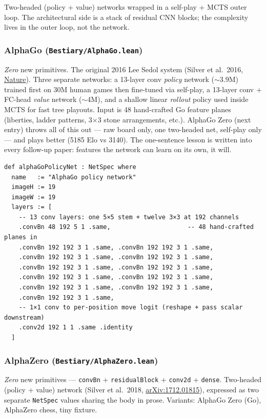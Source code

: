 Two-headed (policy + value) networks wrapped in a self-play + MCTS
outer loop. The architectural side is a stack of residual CNN blocks;
the complexity lives in the outer loop, not the network.

\subsubsection*{AlphaGo (\texttt{Bestiary/AlphaGo.lean})}
\emph{Zero} new primitives. The original 2016 Lee Sedol system
(Silver et al.\ 2016,
\href{https://www.nature.com/articles/nature16961}{Nature}).
Three separate networks: a 13-layer conv \emph{policy} network
($\sim$3.9M) trained first on 30M human games then fine-tuned via
self-play, a 13-layer conv + FC-head \emph{value} network
($\sim$4M), and a shallow linear \emph{rollout} policy used inside
MCTS for fast tree playouts. Input is 48 hand-crafted Go feature
planes (liberties, ladder patterns, 3$\times$3 stone arrangements,
etc.). AlphaGo Zero (next entry) throws all of this out --- raw
board only, one two-headed net, self-play only --- and plays better
(5185 Elo vs 3140). The one-sentence lesson is written into every
follow-up paper: features the network can learn on its own, it will.

\begin{verbatim}
def alphaGoPolicyNet : NetSpec where
  name   := "AlphaGo policy network"
  imageH := 19
  imageW := 19
  layers := [
    -- 13 conv layers: one 5×5 stem + twelve 3×3 at 192 channels
    .convBn 48 192 5 1 .same,                     -- 48 hand-crafted planes in
    .convBn 192 192 3 1 .same, .convBn 192 192 3 1 .same,
    .convBn 192 192 3 1 .same, .convBn 192 192 3 1 .same,
    .convBn 192 192 3 1 .same, .convBn 192 192 3 1 .same,
    .convBn 192 192 3 1 .same, .convBn 192 192 3 1 .same,
    .convBn 192 192 3 1 .same, .convBn 192 192 3 1 .same,
    .convBn 192 192 3 1 .same,
    -- 1×1 conv to per-position move logit (reshape + pass scalar downstream)
    .conv2d 192 1 1 .same .identity
  ]
\end{verbatim}

\subsubsection*{AlphaZero (\texttt{Bestiary/AlphaZero.lean})}
\emph{Zero} new primitives --- \texttt{convBn} + \texttt{residualBlock}
+ \texttt{conv2d} + \texttt{dense}. Two-headed (policy + value) network
(Silver et al.\ 2018,
\href{https://arxiv.org/abs/1712.01815}{arXiv:1712.01815}),
expressed as two separate \texttt{NetSpec} values sharing the body in
prose. Variants: AlphaGo Zero (Go), AlphaZero chess, tiny fixture.


